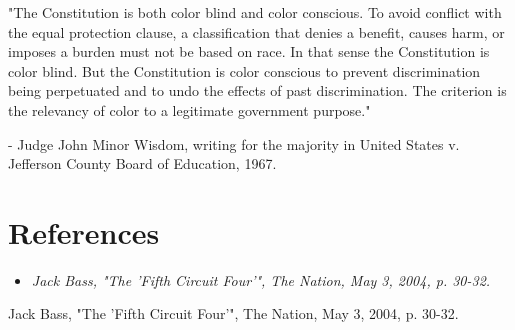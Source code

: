 "The Constitution is both color blind and color conscious. To avoid
conflict with the equal protection clause, a classification that denies
a benefit, causes harm, or imposes a burden must not be based on race.
In that sense the Constitution is color blind. But the Constitution is
color conscious to prevent discrimination being perpetuated and to undo
the effects of past discrimination. The criterion is the relevancy of
color to a legitimate government purpose."

- Judge John Minor Wisdom, writing for the majority in United States v.
Jefferson County Board of Education, 1967.

\section{References}\label{references}

\begin{itemize}
\item
  \emph{Jack Bass, "The 'Fifth Circuit Four'", The Nation, May 3, 2004,
  p. 30-32.}
\end{itemize}

Jack Bass, "The 'Fifth Circuit Four'", The Nation, May 3, 2004, p.
30-32.

